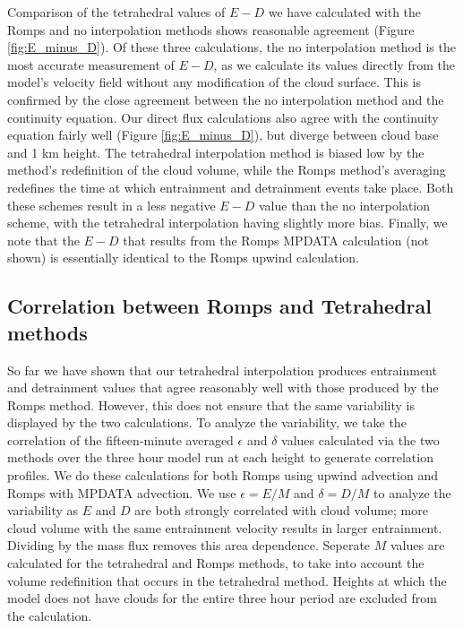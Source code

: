 \documentclass[12pt]{article}
\begin{document}
Comparison of the tetrahedral values of $E-D$ we have calculated with the
Romps and no interpolation methods shows reasonable agreement (Figure 
\ref{fig:E_minus_D}).  Of these three calculations, the no interpolation method 
is the most accurate measurement of $E-D$, as we calculate its values directly 
from the model's velocity field without any modification of the cloud surface.
This is confirmed by the close agreement between the no interpolation method 
and the continuity equation.  Our direct flux calculations also agree with the 
continuity equation fairly well (Figure \ref{fig:E_minus_D}), but diverge 
between cloud base and 1 km height.  The tetrahedral interpolation method is 
biased low by the method's redefinition of the cloud volume, while the Romps 
method's averaging redefines the time at which entrainment and detrainment 
events take place.  Both these schemes result in a less negative $E-D$ value 
than the no interpolation scheme, with the tetrahedral interpolation having 
slightly more bias.  Finally, we note that the $E-D$ that results from the 
Romps MPDATA calculation (not shown) is essentially identical to the Romps 
upwind calculation.


\subsection{Correlation between Romps and Tetrahedral methods}

So far we have shown that our tetrahedral interpolation produces entrainment 
and detrainment values that agree reasonably well with those produced by the 
Romps method.  However, this does not ensure that the same variability is 
displayed by the two calculations.  To analyze the variability, we take the 
correlation of the fifteen-minute averaged $\epsilon$ and $\delta$ values 
calculated via the two methods over the three hour model run at each height 
to generate correlation profiles.  We do these calculations for both Romps 
using upwind advection and Romps with MPDATA advection.  We use 
$\epsilon = E/M$ and $\delta = D/M$ to analyze the variability as $E$ and $D$ 
are both strongly correlated with cloud volume; more cloud volume with the same 
entrainment velocity results in larger entrainment.  Dividing by the mass flux 
removes this area dependence.  Seperate $M$ values are calculated for the
tetrahedral and Romps methods, to take into account the volume redefinition 
that occurs in the tetrahedral method.  Heights at which the model does not 
have clouds for the entire three hour period are excluded from the calculation.  
\end{document}
